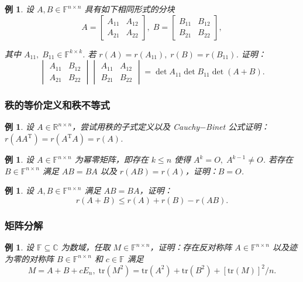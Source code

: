 \documentclass[10pt,openany]{article}
\theoremstyle{thmstyle} %
\theoremstyle{defstyle} %
\theoremstyle{prostyle} %
\theoremstyle{exastyle}
\newtheorem{example}[theorem]{例}
\theoremstyle{remstyle}
\newcommand{\T}{^{\text{T}}}
\newcommand{\F}{\mathbb{F}}
\newcommand{\C}{\mathbb{C}}
\newcommand{\R}{\mathbb{R}}
\newcommand{\n}{^{n \times n}}
\newcommand{\tr}{\mathrm{tr}}
\begin{document}
\begin{example}
	设 \( A,B \in \F\n \) 具有如下相同形式的分块
	\[ A=\begin{bmatrix}
		A_{11} & A_{12} \\
		A_{21} & A_{22}
	\end{bmatrix}, \; B=\begin{bmatrix}
	   B_{11} & B_{12} \\
	   B_{21} & B_{22}
	\end{bmatrix}, \]
	
	其中 \( A_{11}, \; B_{11} \in \F^{k \times k} \). 若 \( r(A)=r(A_{11}), \; r(B)=r(B_{11}) \). 证明：
	\[ \begin{vmatrix}
		A_{11} & B_{12} \\
		A_{21} & B_{22}
	\end{vmatrix} \begin{vmatrix}
	   A_{11} & A_{12} \\
	   B_{21} & B_{22}
	\end{vmatrix}= \det A_{11} \det B_{11} \det (A+B). \]
\end{example}

\subsubsection{秩的等价定义和秩不等式}

\begin{example}
	设 \( A \in \R\n \)，尝试用秩的子式定义以及 Cauchy\(-\)Binet 公式证明：\( r(AA\T)=r(A\T A)=r(A) \).
\end{example}


\begin{example}
	设 \( A \in \F\n \) 为幂零矩阵，即存在 \( k \leq n \) 使得 \( A^k=O, \; A^{k-1} \neq O \). 若存在 \( B \in \F\n \) 满足 \( AB=BA \) 以及 \( r(AB)=r(A) \)，证明：\( B=O \).
\end{example}


\begin{example}
	设 \( A,B \in \F\n \) 满足 \( AB=BA \)，证明：
	\[ r(A+B) \leq r(A)+r(B)-r(AB). \]
\end{example}


\subsubsection{矩阵分解}

\begin{example}
	设 \( \F \subseteq \C \) 为数域，任取 \( M \in \F\n \)，证明：存在反对称阵 \( A \in \F\n \) 以及迹为零的对称阵 \( B \in \F\n \) 和 \( c \in \F \) 满足
	\[ M=A+B+cE_n, \; \tr(M^2)=\tr(A^2)+\tr(B^2)+[\tr(M)]^2/n. \]
\end{example}
\end{document}

